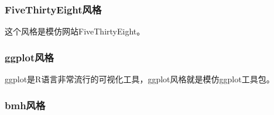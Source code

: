 \documentclass[letterpaper,10pt,english]{sphinxhowto}
\begin{document}


\subsubsection{FiveThirtyEight风格}
\label{\detokenize{_u914d_u7f6e_u6587_u4ef6_u548c_u6837_u5f0f_u8868:fivethirtyeight}}
这个风格是模仿网站FiveThirtyEight。


%
\begin{sphinxVerbatim}[commandchars=\\\{\}]
 
\end{sphinxVerbatim}



\subsubsection{ggplot风格}
\label{\detokenize{_u914d_u7f6e_u6587_u4ef6_u548c_u6837_u5f0f_u8868:ggplot}}
ggplot是R语言非常流行的可视化工具，ggplot风格就是模仿ggplot工具包。

%
\begin{sphinxVerbatim}[commandchars=\\\{\}]
 
\end{sphinxVerbatim}



\subsubsection{bmh风格}
\label{\detokenize{_u914d_u7f6e_u6587_u4ef6_u548c_u6837_u5f0f_u8868:bmh}}
%
\begin{sphinxVerbatim}[commandchars=\\\{\}]
 
\end{sphinxVerbatim}
\end{document}
